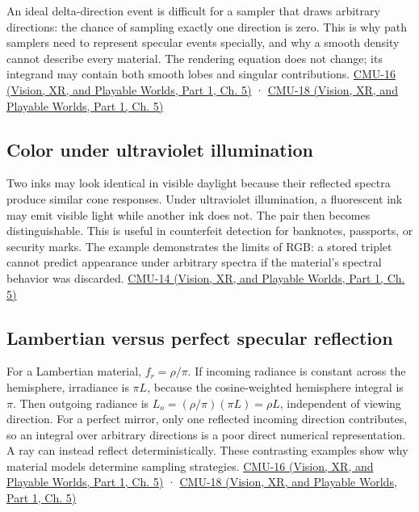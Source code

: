 An ideal delta-direction event is difficult for a sampler that draws arbitrary directions: the chance of sampling exactly one direction is zero. This is why path samplers need to represent specular events specially, and why a smooth density cannot describe every material. The rendering equation does not change; its integrand may contain both smooth lobes and singular contributions. \href{../07-Vision-XR-and-Playable-Worlds-P01/main.pdf\#nameddest=04-visual-computing-ii-ch036-cmu-16---the-rendering-equation}{CMU-16 (Vision, XR, and Playable Worlds, Part 1, Ch. 5)} · \href{../07-Vision-XR-and-Playable-Worlds-P01/main.pdf\#nameddest=04-visual-computing-ii-ch036-cmu-18---monte-carlo-rendering}{CMU-18 (Vision, XR, and Playable Worlds, Part 1, Ch. 5)}

\subsection{Color under ultraviolet illumination}\label{03-visual-computing-i-ch006-color-under-ultraviolet-illumination}

\hypertarget{03-visual-computing-i-ch006-color-under-ultraviolet-illumination}{}

Two inks may look identical in visible daylight because their reflected spectra produce similar cone responses. Under ultraviolet illumination, a fluorescent ink may emit visible light while another ink does not. The pair then becomes distinguishable. This is useful in counterfeit detection for banknotes, passports, or security marks. The example demonstrates the limits of RGB: a stored triplet cannot predict appearance under arbitrary spectra if the material's spectral behavior was discarded. \href{../07-Vision-XR-and-Playable-Worlds-P01/main.pdf\#nameddest=04-visual-computing-ii-ch036-cmu-14---color}{CMU-14 (Vision, XR, and Playable Worlds, Part 1, Ch. 5)}

\subsection{Lambertian versus perfect specular reflection}\label{03-visual-computing-i-ch006-lambertian-versus-perfect-specular-reflection}

\hypertarget{03-visual-computing-i-ch006-lambertian-versus-perfect-specular-reflection}{}

For a Lambertian material, \(f_r=\rho/\pi\). If incoming radiance is constant across the hemisphere, irradiance is \(\pi L\), because the cosine-weighted hemisphere integral is \(\pi\). Then outgoing radiance is \(L_o=(\rho/\pi)(\pi L)=\rho L\), independent of viewing direction. For a perfect mirror, only one reflected incoming direction contributes, so an integral over arbitrary directions is a poor direct numerical representation. A ray can instead reflect deterministically. These contrasting examples show why material models determine sampling strategies. \href{../07-Vision-XR-and-Playable-Worlds-P01/main.pdf\#nameddest=04-visual-computing-ii-ch036-cmu-16---the-rendering-equation}{CMU-16 (Vision, XR, and Playable Worlds, Part 1, Ch. 5)} · \href{../07-Vision-XR-and-Playable-Worlds-P01/main.pdf\#nameddest=04-visual-computing-ii-ch036-cmu-18---monte-carlo-rendering}{CMU-18 (Vision, XR, and Playable Worlds, Part 1, Ch. 5)}

